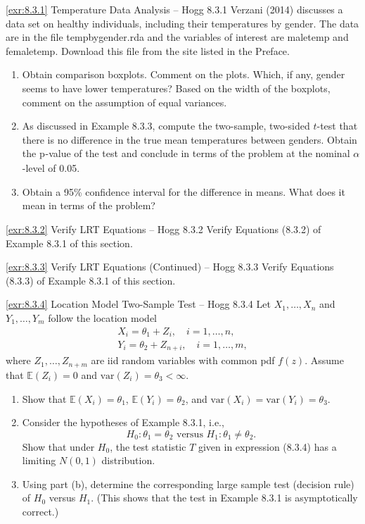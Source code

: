 \begin{exercise}{\ref{exr:8.3.1} Temperature Data Analysis -- Hogg 8.3.1}\label{exr:8.3.1}
Verzani (2014) discusses a data set on healthy individuals, including their temperatures by gender. The data are in the file tempbygender.rda and the variables of interest are maletemp and femaletemp. Download this file from the site listed in the Preface.
\begin{enumerate}
\item[(a)] Obtain comparison boxplots. Comment on the plots. Which, if any, gender seems to have lower temperatures? Based on the width of the boxplots, comment on the assumption of equal variances.
\item[(b)] As discussed in Example 8.3.3, compute the two-sample, two-sided $t$-test that there is no difference in the true mean temperatures between genders. Obtain the $\text{p}_{}$-value of the test and conclude in terms of the problem at the nominal $\alpha$-level of 0.05.
\item[(c)] Obtain a 95\% confidence interval for the difference in means. What does it mean in terms of the problem?
\end{enumerate}
\end{exercise}

\begin{exercise}{\ref{exr:8.3.2} Verify LRT Equations -- Hogg 8.3.2}\label{exr:8.3.2}
Verify Equations (8.3.2) of Example 8.3.1 of this section.
\end{exercise}

\begin{exercise}{\ref{exr:8.3.3} Verify LRT Equations (Continued) -- Hogg 8.3.3}\label{exr:8.3.3}
Verify Equations (8.3.3) of Example 8.3.1 of this section.
\end{exercise}

\begin{exercise}{\ref{exr:8.3.4} Location Model Two-Sample Test -- Hogg 8.3.4}\label{exr:8.3.4}
Let $X_1, \ldots, X_n$ and $Y_1, \ldots, Y_m$ follow the location model
\[
\begin{array}{l}
X_i = \theta_1 + Z_i, \quad i = 1, \ldots, n, \\
Y_i = \theta_2 + Z_{n+i}, \quad i = 1, \ldots, m,
\end{array}
\]
where $Z_1, \ldots, Z_{n+m}$ are iid random variables with common pdf $f(z)$. Assume that $\mathbb{E}(Z_i) = 0$ and $\text{var}(Z_i) = \theta_3 < \infty$.
\begin{enumerate}
\item[(a)] Show that $\mathbb{E}(X_i) = \theta_1$, $\mathbb{E}(Y_i) = \theta_2$, and $\text{var}(X_i) = \text{var}(Y_i) = \theta_3$.
\item[(b)] Consider the hypotheses of Example 8.3.1, i.e.,
\[
H_0: \theta_1 = \theta_2 \text{ versus } H_1: \theta_1 \neq \theta_2.
\]
Show that under $H_0$, the test statistic $T$ given in expression (8.3.4) has a limiting $N(0,1)$ distribution.
\item[(c)] Using part (b), determine the corresponding large sample test (decision rule) of $H_0$ versus $H_1$. (This shows that the test in Example 8.3.1 is asymptotically correct.)
\end{enumerate}
\end{exercise}

